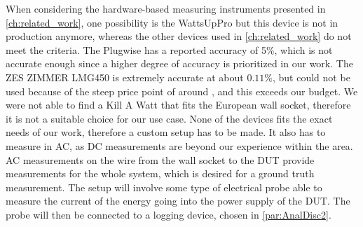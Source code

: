 When considering the hardware-based measuring instruments presented in \cref{ch:related_work}, one possibility is the WattsUpPro but this device is not in production anymore, whereas the other devices used in \cref{ch:related_work} do not meet the criteria. The Plugwise has a reported accuracy of 5\%\cite{PlugWise}, which is not accurate enough since a higher degree of accuracy is prioritized in our work. The ZES ZIMMER LMG450 is extremely accurate at about $0.11\%$\cite{hackenberg2013}, but could not be used because of the steep price point of around , and this exceeds our budget. We were not able to find a Kill A Watt\cite{KillAWatt} that fits the European wall socket, therefore it is not a suitable choice for our use case. None of the devices fits the exact needs of our work, therefore a custom setup has to be made. It also has to measure in AC, as DC measurements are beyond our experience within the area. AC measurements on the wire from the wall socket to the DUT provide measurements for the whole system, which is desired for a ground truth measurement. The setup will involve some type of electrical probe able to measure the current of the energy going into the power supply of the DUT. The probe will then be connected to a logging device, chosen in \cref{par:AnalDisc2}. 

